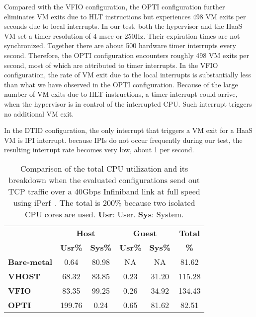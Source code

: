 Compared with the VFIO configuration, the OPTI configuration
further eliminates VM exits due to HLT instructions but
experiences 498 VM exits per seconds due to local interrupts.
In our test, both the hypervisor and the HaaS VM set a timer
resolution of 4 msec or 250Hz. Their expiration times are not
synchronized. Together there are about 500 hardware timer
interrupts every second. Therefore, the OPTI configuration
encounters roughly 498 VM exits per second, most of which are
attributed to timer interrupts. In the VFIO configuration, the
rate of VM exit due to the local interrupts is substantially
less than what we have observed in the OPTI configuration.
Because of the large number of VM exits due to HLT
instructions, a timer interrupt could arrive, when the
hypervisor is in control of the interrupted CPU. Such
interrupt triggers no additional VM exit.

In the DTID configuration, the only interrupt that triggers a
VM exit for a HaaS VM is IPI interrupt. because IPIs do not
occur frequently during our test, the resulting interrupt rate
becomes very low, about 1 per second.

\begin{table}[]
\renewcommand{\arraystretch}{1.2}
\small
\begin{center}
\begin{tabular}{|l|c|c|c|c|c|}
\hline
                    & \multicolumn{2}{c|}{\textbf{Host}}  & \multicolumn{2}{c|}{\textbf{Guest}} & \textbf{Total} \\ \cline{2-5}
                    & \textbf{Usr\%} & \textbf{Sys\%}    & \textbf{Usr\%} & \textbf{Sys\%}    & \textbf{\%}    \\ \hline
\textbf{Bare-metal} & 0.64            & 80.98             & NA              & NA                & 81.62          \\ \hline
\textbf{VHOST}      & 68.32           & 83.85             & 0.23            & 31.20             & 115.28         \\ \hline
\textbf{VFIO}       & 83.35           & 99.25             & 0.26            & 34.92             & 134.43         \\ \hline
\textbf{OPTI}       & 199.76          & 0.24              & 0.65            & 81.62             & 82.51          \\ \hline
\end{tabular}
\end{center}
\caption{Comparison of the total CPU utilization and its
breakdown when the evaluated configurations send out TCP
traffic over a 40Gbps Infiniband link at full speed using
iPerf~\cite{iperf}. The total is 200\% because two isolated
CPU cores are used. \textbf{Usr}: User. \textbf{Sys}: System.}
\label{tab:cpu_utilization_40gbps}
\end{table}

